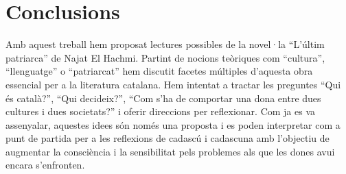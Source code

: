 \section{Conclusions}

Amb aquest treball hem proposat lectures possibles de la novel·la ``L'últim patriarca'' de Najat El Hachmi.
Partint de nocions teòriques com ``cultura'', ``llenguatge'' o ``patriarcat'' hem discutit facetes múltiples d'aquesta obra essencial per a la literatura catalana.
Hem intentat a tractar les preguntes ``Qui és català?'', ``Qui decideix?'', ``Com s’ha de comportar una dona entre dues cultures i dues societats?''
i oferir direccions per reflexionar.
Com ja es va assenyalar, aquestes idees són només una proposta i es poden interpretar com a punt de partida per a les reflexions de cadascú i cadascuna amb l'objectiu de augmentar la consciència i la sensibilitat pels problemes als que les dones avui encara s'enfronten.

\begin{comment}
[Vidal2012]
"Y el mundo de El Hachmi no es sino un
palimpsesto, por eso también lo son sus libros, tablillas en la que se aprecian hue-
llas de escrituras/culturas anteriores y en las que leemos la última, que se nos apa-
rece más perceptible. Sin embargo, las huellas persisten."


\end{comment}
